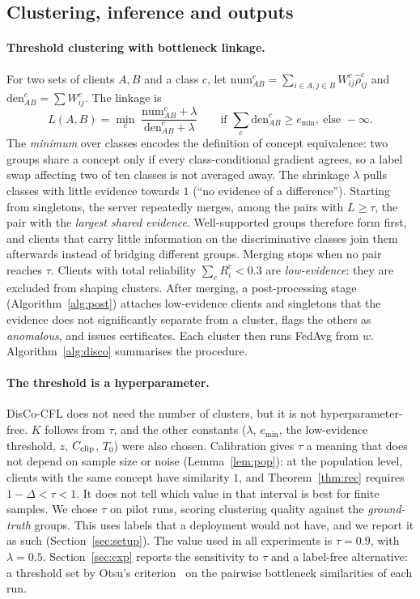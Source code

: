 \documentclass[11pt]{article}
\theoremstyle{definition}
\theoremstyle{remark}
\newcommand{\rhohat}{\hat\rho}
\begin{document}
\subsection{Clustering, inference and outputs}
\paragraph{Threshold clustering with bottleneck linkage.}
For two sets of clients $A,B$ and a class $c$, let $\mathrm{num}^c_{AB}=\sum_{i\in A,j\in B}W_{ij}^c\rhohat_{ij}^c$ and $\mathrm{den}^c_{AB}=\sum W_{ij}^c$. The linkage is
\begin{equation}\label{eq:link}
L(A,B)=\min_{c}\;\frac{\mathrm{num}^c_{AB}+\lambda}{\mathrm{den}^c_{AB}+\lambda}\qquad\text{if }\textstyle\sum_c\mathrm{den}^c_{AB}\ge e_{\min},\ \text{else }-\infty.
\end{equation}
The \emph{minimum} over classes encodes the definition of concept equivalence: two groups share a concept only if every class-conditional gradient agrees, so a label swap affecting two of ten classes is not averaged away. The shrinkage $\lambda$ pulls classes with little evidence towards $1$ (``no evidence of a difference''). Starting from singletons, the server repeatedly merges, among the pairs with $L\ge\tau$, the pair with the \emph{largest shared evidence}. Well-supported groups therefore form first, and clients that carry little information on the discriminative classes join them afterwards instead of bridging different groups. Merging stops when no pair reaches $\tau$. Clients with total reliability $\sum_c R_i^c<0.3$ are \emph{low-evidence}: they are excluded from shaping clusters. After merging, a post-processing stage (Algorithm~\ref{alg:post}) attaches low-evidence clients and singletons that the evidence does not significantly separate from a cluster, flags the others as \emph{anomalous}, and issues certificates. Each cluster then runs FedAvg from $w$. Algorithm~\ref{alg:disco} summarises the procedure.

\paragraph{The threshold is a hyperparameter.} DisCo-CFL does not need the number of clusters, but it is not hyperparameter-free. $K$ follows from $\tau$, and the other constants ($\lambda$, $e_{\min}$, the low-evidence threshold, $z$, $C_{\rm clip}$, $T_0$) were also chosen. Calibration gives $\tau$ a meaning that does not depend on sample size or noise (Lemma~\ref{lem:pop}): at the population level, clients with the same concept have similarity $1$, and Theorem~\ref{thm:rec} requires $1-\Delta<\tau<1$. It does not tell which value in that interval is best for finite samples. We chose $\tau$ on pilot runs, scoring clustering quality against the \emph{ground-truth} groups. This uses labels that a deployment would not have, and we report it as such (Section~\ref{sec:setup}). The value used in all experiments is $\tau=0.9$, with $\lambda=0.5$. Section~\ref{sec:exp} reports the sensitivity to $\tau$ and a label-free alternative: a threshold set by Otsu's criterion~\citep{otsu1979threshold} on the pairwise bottleneck similarities of each run.
\end{document}
